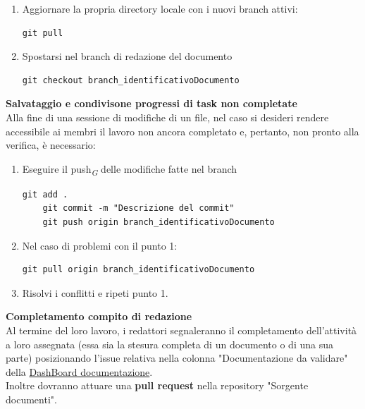 \documentclass{article}
\begin{document}
    \begin{enumerate}
        \item Aggiornare la propria directory locale con i nuovi branch attivi:
        \begin{lstlisting}[style=code]
    git pull
        \end{lstlisting}

        \item Spostarsi nel branch di redazione del documento
        \begin{lstlisting}[style=code]
    git checkout branch_identificativoDocumento
        \end{lstlisting}
    \end{enumerate}
     \textbf{Salvataggio e condivisone progressi di task non completate}\\
    Alla fine di una sessione di modifiche di un file, nel caso si desideri rendere accessibile ai membri il lavoro non ancora completato e, pertanto, non pronto alla verifica, è necessario:
    \begin{enumerate}
        \item Eseguire il push\textsubscript{\textit{G}}  delle modifiche fatte nel branch 
        \begin{lstlisting}[style=code]
    git add .
    git commit -m "Descrizione del commit"
    git push origin branch_identificativoDocumento
        \end{lstlisting}

        \item Nel caso di problemi con il punto 1:
        \begin{lstlisting}[style=code]
   git pull origin branch_identificativoDocumento
        \end{lstlisting}
        \item Risolvi i conflitti e ripeti punto 1.
    \end{enumerate}
\vspace{0.3cm}
     \textbf{Completamento compito di redazione}\\
    Al termine del loro lavoro, i redattori segnaleranno il completamento dell'attività a loro assegnata (essa sia la stesura completa di un documento o di una sua parte) posizionando l'issue relativa nella colonna "Documentazione da validare" della  \href{https://github.com/orgs/ByteOps-swe/projects/1/views/1}{DashBoard documentazione}.\\
    Inoltre dovranno attuare una \textbf{pull request} nella repository "Sorgente documenti".\\
\end{document}
